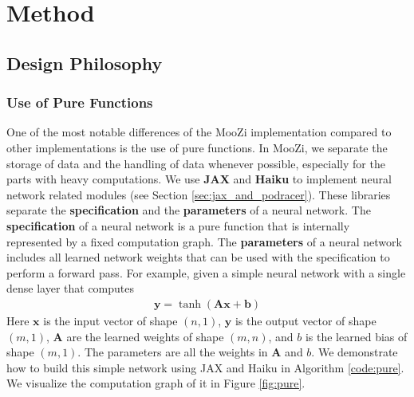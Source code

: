 \chapter{Method} \label{sec:method}
\section{Design Philosophy}
\subsection{Use of Pure Functions}
One of the most notable differences of the MooZi implementation compared to other implementations is the use of pure functions.
In MooZi, we separate the storage of data and the handling of data whenever possible, especially for the parts with heavy computations.
We use \textbf{JAX} and \textbf{Haiku} \cite{HaikuSonnetJAX_Hennigan.Cai.ea_2020,JAXComposableTransformations_JamesBradbury.RoyFrostig.ea_2018} to implement neural network related modules (see Section \ref{sec:jax_and_podracer}).
These libraries separate the \textbf{specification} and the \textbf{parameters} of a neural network.
The \textbf{specification} of a neural network is a pure function that is internally represented by a fixed computation graph.
The \textbf{parameters} of a neural network includes all learned network weights that can be used with the specification to perform a forward pass.
For example, given a simple neural network with a single dense layer that computes
\begin{align*}
    \mathbf{y} = \operatorname{tanh}\left( \mathbf{A}\mathbf{x} + \mathbf{b} \right)
\end{align*}
Here $\mathbf{x}$ is the input vector of shape $(n, 1)$, $\mathbf{y}$ is the output vector of shape $(m, 1)$, $\mathbf{A}$ are the learned weights of shape $(m, n)$, and $b$ is the learned bias of shape $(m, 1)$.
The parameters are all the weights in $\mathbf{A}$ and $b$.
We demonstrate how to build this simple network using JAX and Haiku in Algorithm \ref{code:pure}.
We visualize the computation graph of it in Figure \ref{fig:pure}.
